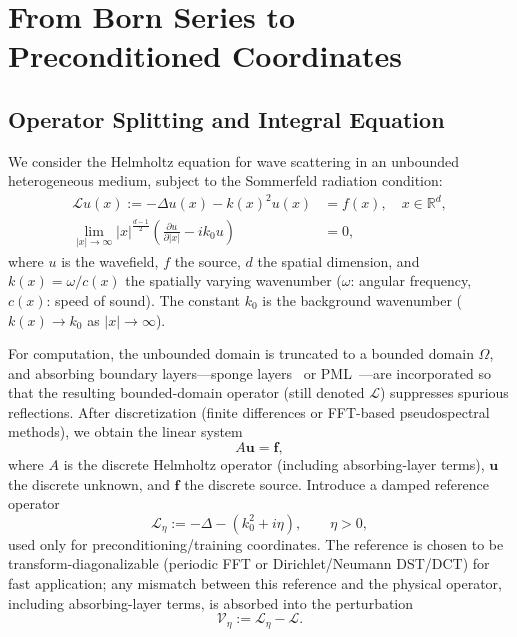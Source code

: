 \documentclass{article}
\theoremstyle{plain}
\theoremstyle{remark}
\begin{document}
\section{From Born Series to Preconditioned Coordinates}
\label{sec:born_identity}
\subsection{Operator Splitting and Integral Equation}
We consider the Helmholtz equation for wave scattering in an unbounded heterogeneous medium, subject to the Sommerfeld radiation condition:
\begin{equation}\label{eq:helm}
\begin{aligned}
    \mathcal{L}u(x) := -\Delta u(x) - k(x)^2 u(x) &= f(x), \quad x \in \mathbb{R}^{d},\\
    \lim_{|x| \to \infty} |x|^{\frac{d-1}{2}} \left( \frac{\partial u}{\partial |x|} - i k_0 u \right) &= 0,
\end{aligned}
\end{equation}
where $u$ is the wavefield, $f$ the source, $d$ the spatial dimension, and $k(x)=\omega/c(x)$ the spatially varying wavenumber ($\omega$: angular frequency, $c(x)$: speed of sound). The constant $k_0$ is the background wavenumber ($k(x)\to k_0$ as $|x|\to\infty$).

For computation, the unbounded domain is truncated to a bounded domain $\Omega$, and absorbing boundary layers---sponge layers~\cite{israeli1981approximation} or PML~\cite{berenger1994perfectly,stanziola2021helmholtz}---are incorporated so that the resulting bounded-domain operator (still denoted $\mathcal{L}$) suppresses spurious reflections. After discretization (finite differences or FFT-based pseudospectral methods), we obtain the linear system
\begin{equation}
A \bm u = \bm f,
\end{equation}
where $A$ is the discrete Helmholtz operator (including absorbing-layer terms), $\bm u$ the discrete unknown, and $\bm f$ the discrete source.
Introduce a damped reference operator
\begin{equation}
\mathcal{L}_\eta := -\Delta - (k_0^2 + i\eta), \qquad \eta>0,
\end{equation}
used only for preconditioning/training coordinates. The reference is chosen to be transform-diagonalizable (periodic FFT or Dirichlet/Neumann DST/DCT) for fast application; any mismatch between this reference and the physical operator, including absorbing-layer terms, is absorbed into the perturbation
\begin{equation}
\mathcal{V}_\eta := \mathcal{L}_\eta - \mathcal{L}.
\end{equation}
\end{document}
